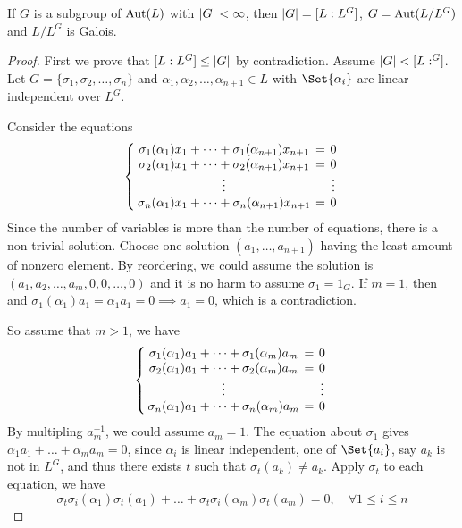 \begin{theorem} \label{thm:extension-of-fix-field-is-galois}
  If $G$ is a subgroup of $\operatorname{Aut}(L)$ with $\lvert G\rvert < \infty$, then $\lvert G\rvert = [L: L^G]$,
  $G = \operatorname{Aut}(L / L^G)$ and $L / L^G$ is Galois.

  \begin{proof}
    First we prove that $[L: L^G] \leq \lvert G\rvert$ by contradiction.
    Assume $\lvert G\rvert < [L: ^G]$. \\
    Let $G = \{\sigma_1, \sigma_2, \dots, \sigma_n\}$ and $\alpha_1, \alpha_2, \dots, \alpha_{n+1} \in L$
    with $\Set{\alpha_i}$ are linear independent over $L^G$.

    Consider the equations
    \[
      \left\{
        \arraycolsep=2pt
        \begin{array}{ccc}
          \sigma_1(\alpha_1) x_1 + \dots + \sigma_1(\alpha_{n+1}) x_{n+1} &=& 0 \\
          \sigma_2(\alpha_1) x_1 + \dots + \sigma_2(\alpha_{n+1}) x_{n+1} &=& 0 \\
          \vdots & & \vdots \\
          \sigma_n(\alpha_1) x_1 + \dots + \sigma_n(\alpha_{n+1}) x_{n+1} &=& 0 \\
        \end{array}
      \right.
    \]
    Since the number of variables is more than the number of equations, there is a
    non-trivial solution. Choose one solution $(a_1, \dots, a_{n+1})$ having the
    least amount of nonzero element. By reordering, we could assume
    the solution is $(a_1, a_2, \dots, a_m, 0, 0, \dots, 0)$ and it is no harm to assume $\sigma_1 = 1_G$.
    If $m = 1$, then and $\sigma_1(\alpha_1) a_1 = \alpha_1 a_1 = 0 \implies a_1 = 0$,
    which is a contradiction.

    So assume that $m > 1$, we have
    \[
      \left\{
        \arraycolsep=2pt
        \begin{array}{ccc}
          \sigma_1(\alpha_1) a_1 + \dots + \sigma_1(\alpha_{m}) a_{m} &=& 0 \\
          \sigma_2(\alpha_1) a_1 + \dots + \sigma_2(\alpha_{m}) a_{m} &=& 0 \\
          \vdots & & \vdots \\
          \sigma_n(\alpha_1) a_1 + \dots + \sigma_n(\alpha_{m}) a_{m} &=& 0 \\
        \end{array}
      \right.
    \]
    By multipling $a_m^{-1}$, we could assume $a_m = 1$. The equation about $\sigma_1$ gives
    $\alpha_1 a_1 + \dots + \alpha_m a_m = 0$, since $\alpha_i$ is linear independent,
    one of $\Set{a_i}$, say $a_k$ is not in $L^G$, and thus there exists $t$
    such that $\sigma_t(a_k) \neq a_k$. Apply $\sigma_t$ to each equation, we have
    \[ \sigma_t\sigma_i(\alpha_1) \sigma_t(a_1) + \dots + \sigma_t \sigma_i(\alpha_m) \sigma_t(a_m) = 0,\quad
      \forall 1 \leq i \leq n \]


\end{proof}
\end{theorem}
